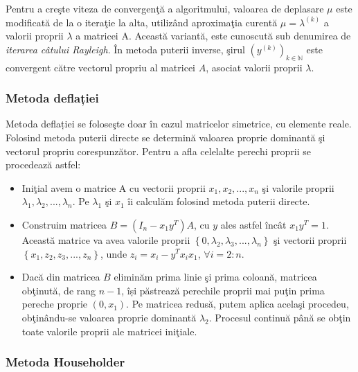 \documentclass{exam}
\begin{document}
Pentru a creşte viteza de convergenţă a algoritmului, valoarea de deplasare $\mu$ este modificată de la o iteraţie la alta, utilizând aproximaţia curentă $ \mu = \lambda ^{(k)}$ a valorii proprii $\lambda$ a matricei A. Această variantă, este cunoscută sub denumirea de \textit{iterarea câtului Rayleigh}.
În metoda puterii inverse, şirul $ \left(y^{\left( k \right)}\right)_{k \in \mathbb{N}}$ este convergent către vectorul propriu al matricei $A$, asociat valorii proprii $\lambda$.


\subsubsection{Metoda deflației}

Metoda deflației se foloseşte doar în cazul matricelor simetrice, cu elemente reale. Folosind metoda puterii directe se  determină valoarea proprie dominantă şi vectorul propriu corespunzător.
Pentru a afla celelalte perechi proprii se procedează astfel:
\begin{itemize}
	\item Iniţial avem o matrice A cu vectorii proprii
	      $x_{1}, x_{2}, ..., x_{n}$ şi valorile proprii
	      $\lambda_{1}, \lambda_{2}, ..., \lambda_{n}$. Pe $\lambda_{1}$ şi $x_{1}$  îi calculăm folosind metoda puterii directe.

	\item Construim matricea $ B = (I_{n} - x_{1}y^{T})A $, cu $y$ ales astfel încât
	      $ x_{1}y^{T} = 1 $. Această matrice va avea valorile proprii $\left\lbrace 0, \lambda_{2}, \lambda_{3} , ... , \lambda_{n}\right\rbrace$  şi vectorii proprii
	      $\left\lbrace x_{1}, z_{2}, z_{3}, ... , z_{n}\right\rbrace$, unde $z_{i} = x_{i} - y^{T}x_{i}x_{1}$, $\forall i = 2:n$.

	\item Dacă din matricea $B$ eliminăm prima linie şi prima coloană, matricea obţinută, de rang $n-1$, își păstrează perechile proprii mai puţin prima pereche proprie $(0, x_1)$. Pe matricea redusă, putem aplica acelaşi procedeu, obţinându-se valoarea proprie dominantă $\lambda_{2}$. Procesul continuă până se obţin toate valorile proprii ale matricei iniţiale.

\end{itemize}

\subsubsection{Metoda Householder}
\end{document}
